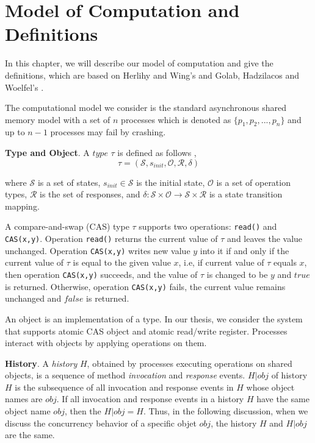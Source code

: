 
\chapter{Model of Computation and Definitions}
In this chapter, we will describe our model of computation and give the definitions, which are based on Herlihy and Wing's \cite{Herlihy:1990:LCC:78969.78972} and Golab, Hadzilacos and Woelfel's \cite{InProc-GHHW2007a}.

The computational model we consider is the standard asynchronous shared memory model with a set of $n$ processes which is denoted as $\{p_1, p_2,...,p_n\}$ and up to $n-1$ processes may fail by crashing.

\textbf{Type and Object}. A $type$ $\tau$ is defined as follows \cite{InProc-GHHW2007a},
$$\tau = (\mathcal{S}, s_{init},\mathcal{O},\mathcal{R} ,\delta )$$

where $\mathcal{S}$ is a set of states, $s_{init} \in \mathcal{S}$ is the initial state, $\mathcal{O}$ is a set of operation types, $\mathcal{R}$ is the set of responses, and $\delta :\mathcal{S} \times \mathcal{O} \to \mathcal{S} \times \mathcal{R}$ is a state transition mapping.

A compare-and-swap (CAS) type $\tau$ supports two operations: \texttt{read()} and \texttt{CAS(x,y)}. Operation \texttt{read()} returns the current value of $\tau$ and leaves the value unchanged. Operation \texttt{CAS(x,y)} writes new value $y$ into it if and only if the current value of $\tau$ is equal to the given value $x$, i.e, if current value of $\tau$ equals $x$, then operation \texttt{CAS(x,y)} succeeds, and the value of $\tau$ is changed to be $y$ and $true$ is returned. Otherwise, operation \texttt{CAS(x,y)} fails, the current value remains unchanged and $false$ is returned.

An object is an implementation of a type. In our thesis, we consider the system that supports atomic CAS object and atomic read/write register. Processes interact with objects by applying operations on them.

\textbf{History}. A \emph{history} $H$, obtained by processes executing operations on shared objects, is a sequence of method \emph{invocation} and \emph{response} events. $H|obj$ of history $H$ is the subsequence of all invocation and response events in $H$ whose object names are $obj$. If all invocation and response events in a history $H$ have the same object name $obj$, then the $H|obj = H$. Thus, in the following discussion, when we discuss the concurrency behavior of a specific objet $obj$, the history $H$ and $H|obj$ are the same.


